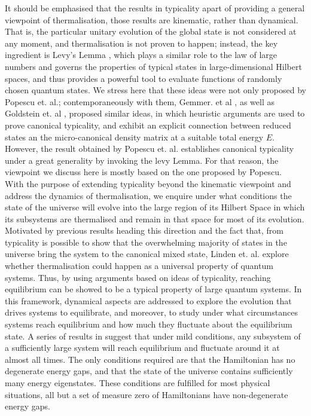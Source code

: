 \indent It should be emphasised that the results in typicality apart of providing a general viewpoint of thermalisation, those results are kinematic, rather than dynamical. That is, the particular unitary evolution of the global state is not considered at any moment, and thermalisation is not proven to happen; instead, the key ingredient is Levy's Lemma \cite{milman_asymptotic_2009, ledoux_concentration_2005}, which plays a similar role to the law of large numbers and governs the properties of typical states in large-dimensional Hilbert spaces\cite{popescu_foundations_2005}, and thus provides a powerful tool to evaluate functions of randomly chosen quantum states. We stress here that these ideas were not only proposed by Popescu et. al.; contemporaneously with them,  Gemmer. et al \cite{gemmer_quantum_2004}, as well as Goldstein et. al \cite{goldstein_canonical_2006}, proposed similar ideas, in which heuristic arguments are used to prove canonical typicality, and exhibit an explicit connection between reduced states an the micro-canonical density matrix at a suitable total energy $E$. However, the result obtained by Popescu et. al. establishes canonical typicality under a great generality by invoking the levy Lemma\cite{popescu_foundations_2005,milman_asymptotic_2009,ledoux_concentration_2005}. For that reason, the viewpoint we discuss here is mostly based on the one proposed by Popescu.\\   
\indent With the purpose of extending typicality beyond the kinematic viewpoint and address the dynamics of thermalisation, we enquire under what conditions the state of the universe will evolve into the large region of its Hilbert Space in which its subsystems are thermalised and remain in that space for most of its evolution. Motivated by previous results heading this direction\cite{tasaki_quantum_1998,gemmer_thermalization_2006} and the fact that, from typicality is possible to show that the overwhelming majority of states in the universe bring the system to the canonical mixed state, Linden et. al.\cite{linden_quantum_2009} explore whether thermalisation could happen as a universal property of quantum systems. Thus, by using arguments based on ideas of typicality, reaching equilibrium can be showed to be a typical property of large quantum systems. In this framework, dynamical aspects are addressed to explore the evolution that drives systems to equilibrate, and moreover, to study under what circumstances systems reach equilibrium and how much they fluctuate about the equilibrium state. A series of results in \cite{linden_quantum_2009, linden_speed_2010, malabarba_quantum_2014} suggest that under mild conditions, any subsystem of a sufficiently large system will reach equilibrium and fluctuate around it at almost all times. The only conditions required are that the Hamiltonian has no degenerate energy gaps, and that the state of the universe contains sufficiently many energy eigenstates. These conditions are fulfilled for most physical situations, all but a set of measure zero of Hamiltonians have non-degenerate energy gaps.\\
